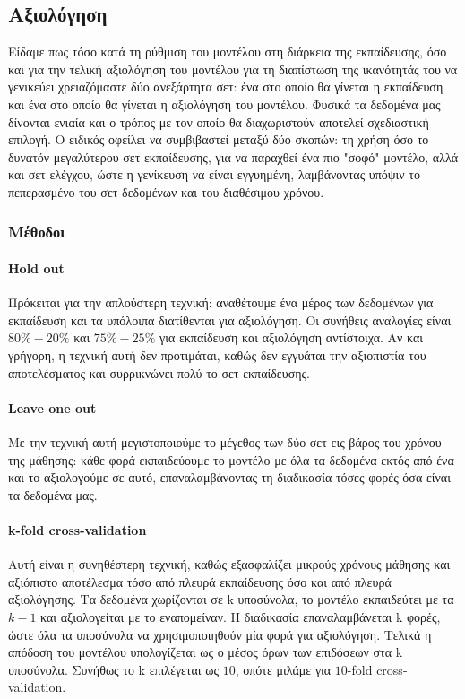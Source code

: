 \subsection{Αξιολόγηση}
Είδαμε πως τόσο κατά τη ρύθμιση του μοντέλου στη διάρκεια της εκπαίδευσης, όσο και για την τελική αξιολόγηση του μοντέλου για τη διαπίστωση της ικανότητάς του να γενικεύει χρειαζόμαστε δύο ανεξάρτητα σετ: ένα στο οποίο θα γίνεται η εκπαίδευση και ένα στο οποίο θα γίνεται η αξιολόγηση του μοντέλου. Φυσικά τα δεδομένα μας δίνονται ενιαία και ο τρόπος με τον οποίο θα διαχωριστούν αποτελεί σχεδιαστική επιλογή. O ειδικός οφείλει να συμβιβαστεί μεταξύ δύο σκοπών: τη
χρήση όσο το δυνατόν μεγαλύτερου σετ εκπαίδευσης, για να παραχθεί ένα πιο "σοφό" μοντέλο, αλλά και σετ ελέγχου, ώστε η γενίκευση να είναι εγγυημένη, λαμβάνοντας υπόψιν το πεπερασμένο του σετ δεδομένων και του διαθέσιμου χρόνου.
\subsubsection{Μέθοδοι} \label{section:eval}
\paragraph{Hold out} Πρόκειται για την απλούστερη τεχνική: αναθέτουμε ένα μέρος των δεδομένων για εκπαίδευση και τα υπόλοιπα διατίθενται για αξιολόγηση. Οι συνήθεις αναλογίες είναι $80\%-20\%$ και $75\%-25\%$ για εκπαίδευση και αξιολόγηση αντίστοιχα. Αν και γρήγορη, η τεχνική αυτή δεν προτιμάται, καθώς δεν εγγυάται την αξιοπιστία του αποτελέσματος και συρρικνώνει πολύ το σετ εκπαίδευσης.
\paragraph{Leave one out} Με την τεχνική αυτή μεγιστοποιούμε το μέγεθος των δύο σετ εις βάρος του χρόνου της μάθησης: κάθε φορά εκπαιδεύουμε το μοντέλο με όλα τα δεδομένα εκτός από ένα και το αξιολογούμε σε αυτό, επαναλαμβάνοντας τη διαδικασία τόσες φορές όσα είναι τα δεδομένα μας.
\paragraph{k-fold cross-validation}Αυτή είναι η συνηθέστερη τεχνική, καθώς εξασφαλίζει μικρούς χρόνους μάθησης και αξιόπιστο αποτέλεσμα τόσο από πλευρά εκπαίδευσης όσο και από πλευρά αξιολόγησης. Τα δεδομένα χωρίζονται σε k υποσύνολα, το μοντέλο εκπαιδεύτει με τα $k-1$ και αξιολογείται με το εναπομείναν. Η διαδικασία επαναλαμβάνεται k φορές, ώστε όλα τα υποσύνολα να χρησιμοποιηθούν μία φορά για
αξιολόγηση. Τελικά η απόδοση του μοντέλου υπολογίζεται ως ο μέσος όρων των επιδόσεων στα k υποσύνολα. Συνήθως το k επιλέγεται ως $10$, οπότε μιλάμε για $10$-fold cross-validation. 
